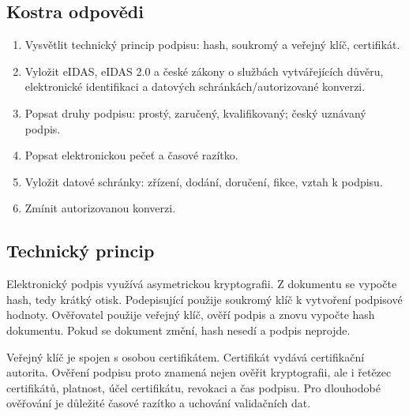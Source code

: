 

\iffalse
{}

\subsection*{Kostra odpovědi}
\begin{enumerate}
  \item Vysvětlit technický princip podpisu: hash, soukromý a veřejný klíč, certifikát.
  \item Vyložit eIDAS, eIDAS 2.0 a české zákony o službách vytvářejících důvěru, elektronické identifikaci a datových schránkách/autorizované konverzi.
  \item Popsat druhy podpisu: prostý, zaručený, kvalifikovaný; český uznávaný podpis.
  \item Popsat elektronickou pečeť a časové razítko.
  \item Vyložit datové schránky: zřízení, dodání, doručení, fikce, vztah k podpisu.
  \item Zmínit autorizovanou konverzi.
\end{enumerate}

\subsection*{Technický princip}
Elektronický podpis využívá asymetrickou kryptografii. Z dokumentu se vypočte hash, tedy krátký otisk. Podepisující použije soukromý klíč k vytvoření podpisové hodnoty. Ověřovatel použije veřejný klíč, ověří podpis a znovu vypočte hash dokumentu. Pokud se dokument změní, hash nesedí a podpis neprojde.

Veřejný klíč je spojen s osobou certifikátem. Certifikát vydává certifikační autorita. Ověření podpisu proto znamená nejen ověřit kryptografii, ale i řetězec certifikátů, platnost, účel certifikátu, revokaci a čas podpisu. Pro dlouhodobé ověřování je důležité časové razítko a uchování validačních dat.

